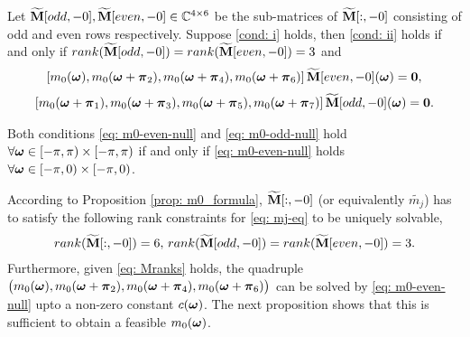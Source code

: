 \begin{proposition}\label{prop: m0_formula}
Let $\widetilde{\mathbf{M}}[odd,-0],\widetilde{\mathbf{M}}[even,-0]\in\mathbb{C}^{4\times6}$ be the sub-matrices of $\widetilde{\mathbf{M}}[:,-0]$ consisting of odd and even rows respectively. Suppose \ref{cond: i} holds, then \ref{cond: ii} holds if and only if $rank(\widetilde{\mathbf{M}}[odd,-0]) = rank(\widetilde{\mathbf{M}}[even,-0]) = 3$ and 
\begin{align}\label{eq: m0-even-null}
[m_0(\boldsymbol{\omega}),m_0(\boldsymbol{\omega}+\boldsymbol{\pi}_2), m_0(\boldsymbol{\omega} +\boldsymbol{\pi}_4), m_0(\boldsymbol{\omega}+\boldsymbol{\pi}_6)]\, \widetilde{\mathbf{M}}[even,-0](\boldsymbol{\omega}) = \boldsymbol{0},
\end{align}
\begin{align}\label{eq: m0-odd-null}
[m_0(\boldsymbol{\omega}+\boldsymbol{\pi}_1),m_0(\boldsymbol{\omega}+\boldsymbol{\pi}_3), m_0(\boldsymbol{\omega} +\boldsymbol{\pi}_5), m_0(\boldsymbol{\omega}+\boldsymbol{\pi}_7)] \,\widetilde{\mathbf{M}}[odd,-0](\boldsymbol{\omega}) = \boldsymbol{0}.
\end{align}
\end{proposition}
 Both conditions \eqref{eq: m0-even-null} and \eqref{eq: m0-odd-null} hold $\forall \boldsymbol{\omega}\in[-\pi,\pi)\times[-\pi,\pi)$ if and only if \eqref{eq: m0-even-null} holds $\forall \boldsymbol{\omega}\in [-\pi,0)\times[-\pi,0)$.

According to Proposition \ref{prop: m0_formula}, $\widetilde{\mathbf{M}}[:,-0]$ (or equivalently $\widetilde{m_j}$) has to satisfy the following rank constraints for \eqref{eq: mj-eq} to be uniquely solvable, 
\begin{align}\label{eq: Mranks}
rank(\widetilde{\mathbf{M}}[:,-0]) = 6,\, rank(\widetilde{\mathbf{M}}[odd,-0]) = rank(\widetilde{\mathbf{M}}[even,-0]) = 3.
\end{align}
Furthermore, given \eqref{eq: Mranks} holds, the quadruple  $\big( m_0(\boldsymbol{\omega}),m_0(\boldsymbol{\omega}+\boldsymbol{\pi}_2), m_0(\boldsymbol{\omega} +\boldsymbol{\pi}_4), m_0(\boldsymbol{\omega}+\boldsymbol{\pi}_6) \big)$ can be solved by \eqref{eq: m0-even-null} upto a non-zero constant $c(\boldsymbol{\omega})$. The next proposition shows that this is sufficient to obtain a feasible $m_0(\boldsymbol{\omega})$.

